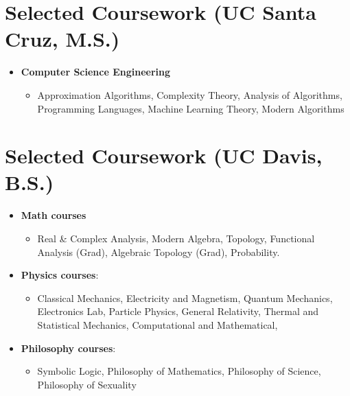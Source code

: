 \documentclass{curriculum-vitae}
\begin{document}
\section{Selected Coursework (UC Santa Cruz, M.S.)}
\begin{itemize}
  \item\textbf{Computer Science Engineering}
    \begin{itemize}
      \item Approximation Algorithms, Complexity Theory, Analysis of Algorithms, Programming Languages, Machine Learning Theory, Modern Algorithms
    \end{itemize}


\end{itemize}

\section{Selected Coursework (UC Davis, B.S.)}
\begin{itemize}
  \item\textbf{Math courses}
    \begin{itemize}
      \item Real \& Complex Analysis, Modern Algebra, Topology, Functional Analysis (Grad), Algebraic Topology (Grad), Probability.
    \end{itemize}


  \item\textbf{Physics courses}:
    \begin{itemize}
      \item Classical Mechanics,
        Electricity and Magnetism,
        Quantum Mechanics,
        Electronics Lab,
        Particle Physics,
        General Relativity,
        Thermal and Statistical Mechanics,
        Computational and Mathematical,

    \end{itemize}

  \item\textbf{Philosophy courses}:
    \begin{itemize}
      \item Symbolic Logic,
        Philosophy of Mathematics,
        Philosophy of Science,
        Philosophy of Sexuality
    \end{itemize}
\end{itemize}
\end{document}
